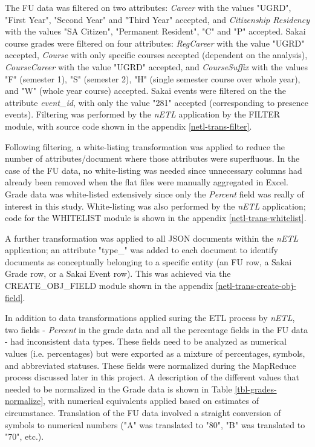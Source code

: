 The FU data was filtered on two attributes: \textit{Career} with the values "UGRD", "First Year", "Second Year" and "Third Year" accepted, and \textit{Citizenship Residency} with the values "SA Citizen", "Permanent Resident", "C" and "P" accepted. Sakai course grades were filtered on four attributes: \textit{RegCareer} with the value "UGRD" accepted, \textit{Course} with only specific courses accepted (dependent on the analysis), \textit{CourseCareer} with the value "UGRD" accepted, and \textit{CourseSuffix} with the values "F" (semester 1), "S" (semester 2), "H" (single semester course over whole year), and "W" (whole year course) accepted. Sakai events were filtered on the the attribute \textit{event\_id}, with only the value "281" accepted (corresponding to presence events). Filtering was performed by the \textit{nETL} application by the FILTER module, with source code shown in the appendix \ref{netl-trans-filter}.

Following filtering, a white-listing transformation was applied to reduce the number of attributes/document where those attributes were superfluous. In the case of the FU data, no white-listing was needed since unnecessary columns had already been removed when the flat files were manually aggregated in Excel. Grade data was white-listed extensively since only the \textit{Percent} field was really of interest in this study. White-listing was also performed by the \textit{nETL} application; code for the WHITELIST module is shown in the appendix \ref{netl-trans-whitelist}.

A further transformation was applied to all JSON documents within the \textit{nETL} application; an attribute "type\_" was added to each document to identify documents as conceptually belonging to a specific entity (an FU row, a Sakai Grade row, or a Sakai Event row). This was achieved via the CREATE\_OBJ\_FIELD module shown in the appendix \ref{netl-trans-create-obj-field}.

In addition to data transformations applied suring the ETL process by \textit{nETL}, two fields - \textit{Percent} in the grade data and all the percentage fields in the FU data - had inconsistent data types. These fields need to be analyzed as numerical values (i.e. percentages) but were exported as a mixture of percentages, symbols, and abbreviated statuses. These fields were normalized during the MapReduce process discussed later in this project. A description of the different values that needed to be normalized in the Grade data is shown in Table \ref{tbl-grades-normalize}, with numerical equivalents applied based on estimates of circumstance. Translation of the FU data involved a straight conversion of symbols to numerical numbers ("A" was translated to "80", "B" was translated to "70", etc.).

